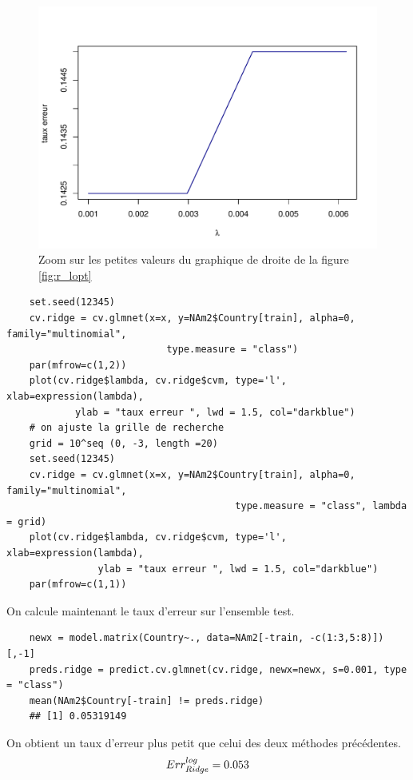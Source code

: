 \documentclass[12pt,a4paper]{article}
\begin{document}
\begin{figure}[h!]
	\begin{center}
		\includegraphics[scale=0.5]{figures/zoom_r_lopt.pdf}
		\caption{Zoom sur les petites valeurs du graphique de droite de la figure \ref{fig:r_lopt}}
		\label{fig:zoom_r}
	\end{center}
\end{figure}
\begin{lstlisting}
	set.seed(12345)
	cv.ridge = cv.glmnet(x=x, y=NAm2$Country[train], alpha=0, family="multinomial",
							type.measure = "class")
	par(mfrow=c(1,2))
	plot(cv.ridge$lambda, cv.ridge$cvm, type='l', xlab=expression(lambda),
			ylab = "taux erreur ", lwd = 1.5, col="darkblue")
	# on ajuste la grille de recherche		
	grid = 10^seq (0, -3, length =20)
	set.seed(12345)
	cv.ridge = cv.glmnet(x=x, y=NAm2$Country[train], alpha=0, family="multinomial",
										type.measure = "class", lambda = grid)
	plot(cv.ridge$lambda, cv.ridge$cvm, type='l', xlab=expression(lambda),
				ylab = "taux erreur ", lwd = 1.5, col="darkblue")
	par(mfrow=c(1,1))
\end{lstlisting}
On calcule maintenant le taux d'erreur sur l'ensemble test. \vspace{2mm}
\begin{lstlisting}
	newx = model.matrix(Country~., data=NAm2[-train, -c(1:3,5:8)])[,-1]
	preds.ridge = predict.cv.glmnet(cv.ridge, newx=newx, s=0.001, type = "class")
	mean(NAm2$Country[-train] != preds.ridge)
	## [1] 0.05319149
\end{lstlisting}
On obtient un taux d'erreur plus petit que celui des deux méthodes précédentes.\vspace{-3mm} \[Err_{Ridge}^{log} = 0.053\vspace{-4mm}\]
\end{document}
